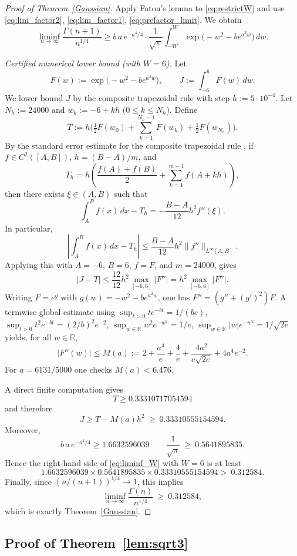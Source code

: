 \documentclass[11pt]{article}
\begin{document}
\begin{proof}[Proof of Theorem~\ref{Gaussian}]
Apply Fatou's lemma to \eqref{eq:restrictW} and use
\eqref{eq:lim_factor2}, \eqref{eq:lim_factor1}, \eqref{eq:prefactor_limit}. We obtain
\begin{equation}\label{eq:liminf_W}
\liminf_{n\to\infty}\frac{\Gamma(n+1)}{n^{1/4}}
\ge
b\,a\,e^{-a^4/4}\cdot \frac{1}{\sqrt{\pi}}
\int_{-W}^{W}\exp\big(-w^2-b e^{a^2 w}\big)\,dw.
\end{equation}

\smallskip\noindent
\emph{Certified numerical lower bound (with $W=6$).}
Let
\[
F(w):=\exp\big(-w^2-b e^{a^2 w}\big),
\qquad
J:=\int_{-6}^{6}F(w)\,dw.
\]
We lower bound $J$ by the composite trapezoidal rule with step $h:=5\cdot 10^{-4}$.
Let $N_h:=24000$ and $w_k:=-6+kh$ ($0\le k\le N_h$). Define
\[
T:=h\Big(\tfrac12 F(w_0)+\sum_{k=1}^{N_h-1}F(w_k)+\tfrac12 F(w_{N_h})\Big).
\]
By the standard error estimate for the composite trapezoidal rule
\cite[Sec.~4.4, Thm.~4.5]{BurdenFairesBurden2016}, if
\(f\in C^2([A,B])\), \(h=(B-A)/m\), and
\[
T_h
=
h\left(\frac{f(A)+f(B)}{2}
+\sum_{k=1}^{m-1} f(A+kh)\right),
\]
then there exists \(\xi\in(A,B)\) such that
\[
\int_A^B f(x)\,dx-T_h
=
-\frac{B-A}{12}h^2 f''(\xi).
\]
In particular,
\[
\left|\int_A^B f(x)\,dx-T_h\right|
\le
\frac{B-A}{12}h^2\|f''\|_{L^\infty[A,B]}.
\]
Applying this with \(A=-6\), \(B=6\), \(f=F\), and \(m=24000\), gives
\[
|J-T|\le \frac{12}{12}h^2\max_{[-6,6]}|F''|
=h^2\max_{[-6,6]}|F''|.
\]
Writing $F=e^{g}$ with $g(w)=-w^2-b e^{a^2 w}$, one has
$F''=(g''+(g')^2)F$. A termwise global estimate using
$\sup_{t>0}t e^{-bt}=1/(be)$,
$\sup_{t>0}t^2 e^{-bt}=(2/b)^2e^{-2}$,
$\sup_{w\in\mathbb{R}}w^2e^{-w^2}=1/e$,
$\sup_{w\in\mathbb{R}}|w|e^{-w^2}=1/\sqrt{2e}$
yields, for all $w\in\mathbb{R}$,
\[
|F''(w)|\le
M(a):=
2+\frac{a^4}{e}+\frac{4}{e}+\frac{4a^2}{e\sqrt{2e}}+4a^4 e^{-2}.
\]
For $a=6131/5000$ one checks $M(a)<6.476$.

A direct finite computation gives
\[
T \geq 0.33310717054594
\]
and therefore
\[
J\ge T - M(a)h^2 \ \ge\ 0.33310555154594.
\]
Moreover,
\[
b\,a\,e^{-a^4/4} \geq 1.6632596039 \qquad
\frac{1}{\sqrt{\pi}}\ \ge\ 0.5641895835.
\]
Hence the right-hand side of \eqref{eq:liminf_W} with $W=6$ is at least
\[
1.6632596039 \times 0.5641895835 \times 0.33310555154594 >\ 0.312584.
\]
Finally, since $(n/(n+1))^{1/4}\to 1$, this implies
\[
\liminf_{n\to\infty}\frac{\Gamma(n)}{n^{1/4}}\ \ge\ 0.312584,
\]
which is exactly Theorem~\ref{Gaussian}.
\end{proof}


\subsection{Proof of Theorem~\ref{lem:sqrt3}}
\end{document}
